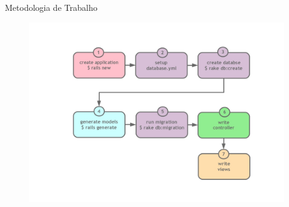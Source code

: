 \begin{frame}[fragile,t]{Metodologia de Trabalho}
	\begin{figure}[h!]
		\centering
		\includegraphics[width=.9\textwidth]{imagens/metodologia-de-trabalho.jpg}
	\end{figure}
\end{frame}
